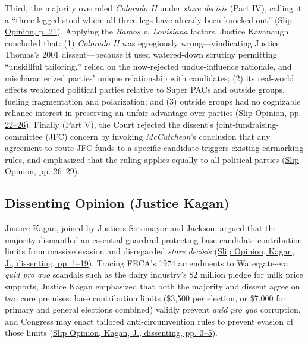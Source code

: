\documentclass[12pt]{article}
\begin{document}
Third, the majority overruled \textit{Colorado II} under \textit{stare decisis} (Part IV), calling it a ``three-legged stool where all three legs have already been knocked out'' (\href{https://www.supremecourt.gov/opinions/25pdf/24-621_h315.pdf}{Slip Opinion, p. 21}). Applying the \textit{Ramos v. Louisiana} factors, Justice Kavanaugh concluded that: (1) \textit{Colorado II} was egregiously wrong---vindicating Justice Thomas's 2001 dissent---because it used watered-down scrutiny permitting ``unskillful tailoring,'' relied on the now-rejected undue-influence rationale, and mischaracterized parties' unique relationship with candidates; (2) its real-world effects weakened political parties relative to Super PACs and outside groups, fueling fragmentation and polarization; and (3) outside groups had no cognizable reliance interest in preserving an unfair advantage over parties (\href{https://www.supremecourt.gov/opinions/25pdf/24-621_h315.pdf}{Slip Opinion, pp. 22--26}). Finally (Part V), the Court rejected the dissent's joint-fundraising-committee (JFC) concern by invoking \textit{McCutcheon}'s conclusion that any agreement to route JFC funds to a specific candidate triggers existing earmarking rules, and emphasized that the ruling applies equally to all political parties (\href{https://www.supremecourt.gov/opinions/25pdf/24-621_h315.pdf}{Slip Opinion, pp. 26--29}).

\subsection{Dissenting Opinion (Justice Kagan)}
Justice Kagan, joined by Justices Sotomayor and Jackson, argued that the majority dismantled an essential guardrail protecting base candidate contribution limits from massive evasion and disregarded \textit{stare decisis} (\href{https://www.supremecourt.gov/opinions/25pdf/24-621_h315.pdf}{Slip Opinion, Kagan, J., dissenting, pp. 1--19}). Tracing FECA's 1974 amendments to Watergate-era \textit{quid pro quo} scandals such as the dairy industry's \$2 million pledge for milk price supports, Justice Kagan emphasized that both the majority and dissent agree on two core premises: base contribution limits (\$3,500 per election, or \$7,000 for primary and general elections combined) validly prevent \textit{quid pro quo} corruption, and Congress may enact tailored anti-circumvention rules to prevent evasion of those limits (\href{https://www.supremecourt.gov/opinions/25pdf/24-621_h315.pdf}{Slip Opinion, Kagan, J., dissenting, pp. 3--5}).
\end{document}
